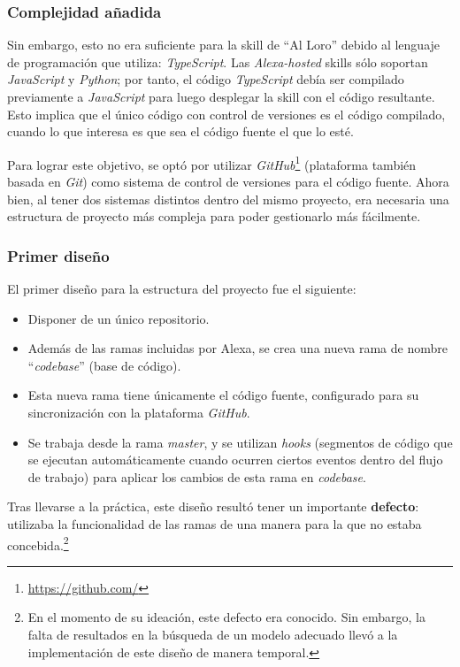 \documentclass[11pt,spanish,listoffigures,listoftables,table,hyphens,dvipsnames]{tfgetsinf}
\begin{document}
\subsubsection{Complejidad añadida}

Sin embargo, esto no era suficiente para la skill de ``Al Loro'' debido al lenguaje de programación que utiliza: \emph{TypeScript}. Las \emph{Alexa-hosted} skills sólo soportan \emph{JavaScript} y \emph{Python}; por tanto, el código \emph{TypeScript} debía ser compilado previamente a \emph{JavaScript} para luego desplegar la skill con el código resultante. Esto implica que el único código con control de versiones es el código compilado, cuando lo que interesa es que sea el código fuente el que lo esté.

Para lograr este objetivo, se optó por utilizar \emph{GitHub}\footnote{\url{https://github.com/}} (plataforma también basada en \emph{Git}) como sistema de control de versiones para el código fuente. Ahora bien, al tener dos sistemas distintos dentro del mismo proyecto, era necesaria una estructura de proyecto más compleja para poder gestionarlo más fácilmente.

\subsubsection{Primer diseño}

El primer diseño para la estructura del proyecto fue el siguiente:

\begin{itemize}
   \item Disponer de un único repositorio.
   \item Además de las ramas incluidas por Alexa, se crea una nueva rama de nombre ``\emph{codebase}'' (base de código).
   \item Esta nueva rama tiene únicamente el código fuente, configurado para su sincronización con la plataforma \emph{GitHub}.
   \item Se trabaja desde la rama \emph{master}, y se utilizan \emph{hooks} (segmentos de código que se ejecutan automáticamente cuando ocurren ciertos eventos dentro del flujo de trabajo) para aplicar los cambios de esta rama en \emph{codebase}.
\end{itemize}

Tras llevarse a la práctica, este diseño resultó tener un importante \textbf{defecto}: utilizaba la funcionalidad de las ramas de una manera para la que no estaba concebida.\footnote{En el momento de su ideación, este defecto era conocido. Sin embargo, la falta de resultados en la búsqueda de un modelo adecuado llevó a la implementación de este diseño de manera temporal.}
\end{document}
